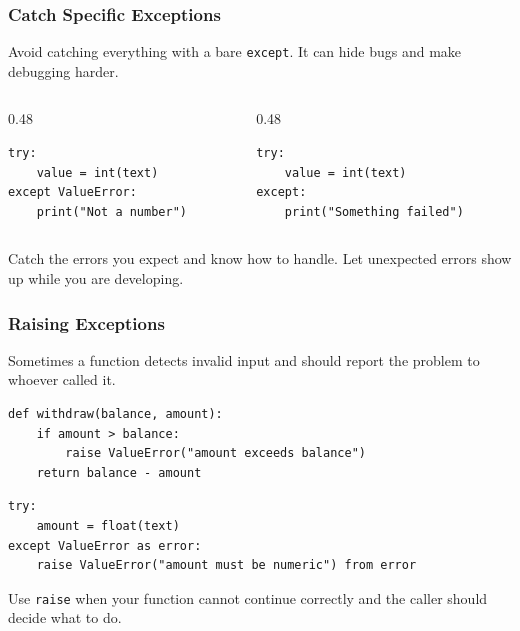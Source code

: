 \documentclass[aspectratio=169,10pt]{beamer}
\newcommand{\codeword}[1]{\texttt{#1}}
\begin{document}
\begin{frame}[fragile]
\frametitle{Catch Specific Exceptions}
\small
Avoid catching everything with a bare \codeword{except}. It can hide bugs and make debugging harder.

\vspace{0.15cm}
\begin{columns}[T,totalwidth=0.96\textwidth]
\begin{column}{0.48\textwidth}
\begin{tcolorbox}[lecturebox,title=Better]
\begin{lstlisting}[style=pycodesmall]
try:
    value = int(text)
except ValueError:
    print("Not a number")
\end{lstlisting}
\end{tcolorbox}
\end{column}
\begin{column}{0.48\textwidth}
\begin{tcolorbox}[lecturebox,title=Avoid]
\begin{lstlisting}[style=pycodesmall]
try:
    value = int(text)
except:
    print("Something failed")
\end{lstlisting}
\end{tcolorbox}
\end{column}
\end{columns}

\begin{tcolorbox}[lecturebox,title=Rule of thumb]
Catch the errors you expect and know how to handle. Let unexpected errors show up while you are developing.
\end{tcolorbox}
\end{frame}

\begin{frame}[fragile]
\frametitle{Raising Exceptions}
\small
Sometimes a function detects invalid input and should report the problem to whoever called it.

\vspace{0.15cm}
\begin{lstlisting}[style=pycode]
def withdraw(balance, amount):
    if amount > balance:
        raise ValueError("amount exceeds balance")
    return balance - amount
\end{lstlisting}

\begin{tcolorbox}[lecturebox,title=Re-raising with context]
\begin{lstlisting}[style=pycodesmall]
try:
    amount = float(text)
except ValueError as error:
    raise ValueError("amount must be numeric") from error
\end{lstlisting}
\end{tcolorbox}

\begin{tcolorbox}[lecturebox,title=Key idea]
Use \codeword{raise} when your function cannot continue correctly and the caller should decide what to do.
\end{tcolorbox}
\end{frame}
\end{document}
